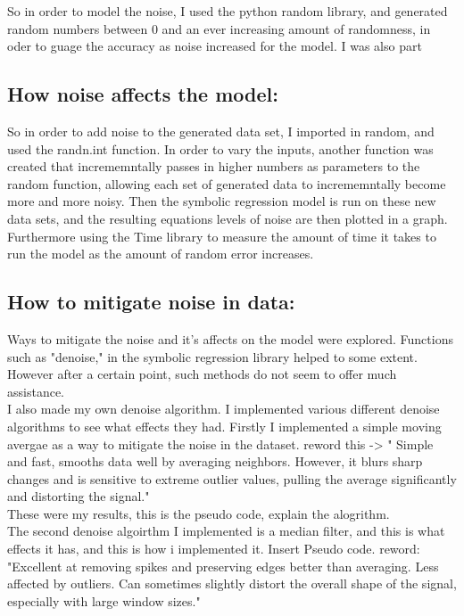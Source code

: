 \documentclass{article}
\begin{document}
So in order to model the noise, I used the python random library, and generated random numbers between 0 and an ever increasing amount of randomness, in oder to guage the accuracy as noise increased for the model. I was also part




\subsection{How noise affects the model: }

So in order to add noise to the generated data set, I imported in random, and used the randn.int function. In order to vary the inputs, another function was created that incrememntally passes in higher numbers as parameters to the random function, allowing each set of generated data to incrememntally become more and more noisy. Then the symbolic regression model is run on these new data sets, and the resulting equations levels of noise are then plotted in a graph. Furthermore using the Time library to measure the amount of time it takes to run the model as the amount of random error increases. \\ 


\subsection{How to mitigate noise in data: }

Ways to mitigate the noise and it's affects on the model were explored. Functions such as "denoise," in the symbolic regression library helped to some extent. However after a certain point, such methods do not seem to offer much assistance.\\

I also made my own denoise algorithm. I implemented various different denoise algorithms to see what effects they had. Firstly I implemented a simple moving avergae as a way to mitigate the noise in the dataset. reword this -> "
Simple and fast, smooths data well by averaging neighbors. However, it blurs sharp changes and is sensitive to extreme outlier values, pulling the average significantly and distorting the signal."\\

These were my results, this is the pseudo code, explain the alogrithm.\\ 

The second denoise algoirthm I implemented is a median filter, and this is what effects it has, and this is how i implemented it. Insert Pseudo code. reword: "Excellent at removing spikes and preserving edges better than averaging. Less affected by outliers. Can sometimes slightly distort the overall shape of the signal, especially with large window sizes."\\
\end{document}
